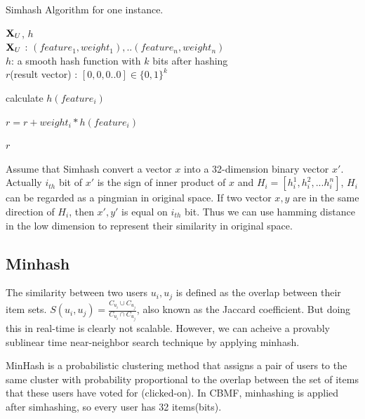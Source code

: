 \begin{algorithm}[tb]
\caption{Simhash Algorithm for one instance.}
\begin{algorithmic}

 $\mathbf{X}_U$, $h$\\
$\mathbf{X}_{U}$ : $(feature_1, weight_1),..(feature_n,weight_n)$ \\
$h$: a smooth hash function with $k$ bits after hashing\\

 $r$(result vector) : $[0,0,0..0] \in \{0,1\}^k$


\STATE calculate $h(feature_i)$

\STATE $r = r + weight_i * h(feature_i)$

\ENDFOR

\ELSE 
{}
\ENDIF
\ENDFOR

 $r$

\end{algorithmic}
\label{algorithm:simhash}
\end{algorithm}

Assume that Simhash convert a vector $x$ into a 32-dimension binary vector $x'$. Actually $i_{th}$ bit of $x'$ is the sign of inner product of $x$ and $H_i = [h^1_i, h^2_i,...h^n_i]$, $H_i$ can be regarded as a pingmian in original space. If two vector $x, y$ are in the same direction of $H_i$, then $x', y'$ is equal on $i_{th}$ bit. Thus we can use hamming distance in the low dimension to represent their similarity in original space.

\subsection{Minhash}

The similarity between two users $u_i , u_j$ is defined as the overlap between their item sets. $S(u_i, u_j) = \frac{C_{u_i} \cup C_{u_j}}{C_{u_i} \cap C_{u_j}}$, also known as the Jaccard coefficient. But doing this in real-time is clearly not scalable. However, we can acheive a provably sublinear time near-neighbor search technique by applying minhash.

MinHash is a probabilistic clustering method that assigns a pair of users to the same cluster with probability proportional to the overlap between the set of items that these users have voted for (clicked-on). In CBMF, minhashing is applied after simhashing, so every user has 32 items(bits). 

